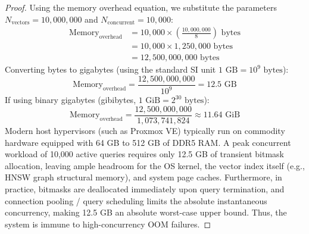 \documentclass[sigconf]{acmart}
\begin{document}
\begin{proof}
Using the memory overhead equation, we substitute the parameters $N_{\text{vectors}} = 10,000,000$ and $N_{\text{concurrent}} = 10,000$:
\begin{align*}
    \text{Memory}_{\text{overhead}} &= 10,000 \times \left( \frac{10,000,000}{8} \right) \text{ bytes} \\
    &= 10,000 \times 1,250,000 \text{ bytes} \\
    &= 12,500,000,000 \text{ bytes}
\end{align*}
Converting bytes to gigabytes (using the standard SI unit $1\text{ GB} = 10^9\text{ bytes}$):
\begin{equation}
    \text{Memory}_{\text{overhead}} = \frac{12,500,000,000}{10^9} = 12.5\text{ GB}
\end{equation}
If using binary gigabytes (gibibytes, $1\text{ GiB} = 2^{30}\text{ bytes}$):
\begin{equation}
    \text{Memory}_{\text{overhead}} = \frac{12,500,000,000}{1,073,741,824} \approx 11.64\text{ GiB}
\end{equation}
Modern host hypervisors (such as Proxmox VE) typically run on commodity hardware equipped with 64 GB to 512 GB of DDR5 RAM. A peak concurrent workload of 10,000 active queries requires only 12.5 GB of transient bitmask allocation, leaving ample headroom for the OS kernel, the vector index itself (e.g., HNSW graph structural memory), and system page caches. Furthermore, in practice, bitmasks are deallocated immediately upon query termination, and connection pooling / query scheduling limits the absolute instantaneous concurrency, making 12.5 GB an absolute worst-case upper bound. Thus, the system is immune to high-concurrency OOM failures.
\end{proof}



\end{document}
